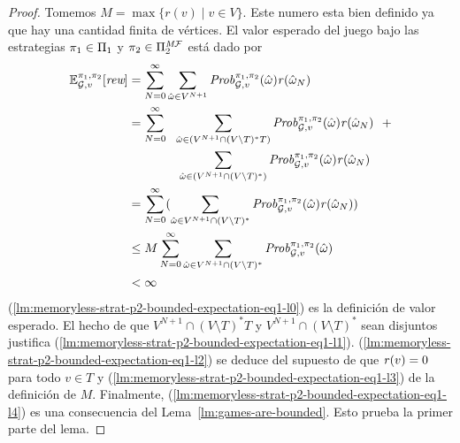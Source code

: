 \begin{proof}
  Tomemos $M = \max \{r(v) \mid v \in V\}$.  Este numero esta bien definido ya que
  hay una cantidad finita de vértices.
  El valor esperado del juego bajo las estrategias
  $\pi_{1} \in \Pi_{1}$ y $\pi_{2} \in \Pi^{\textit{M}\mathcal{F}}_{2}$
  está dado por
  \begin{align}	
    \label{lm:memoryless-strat-p2-bounded-expectation-eq1-l0}
    \mathbb{E}^{\pi_{1}, \pi_{2}}_{\mathcal{G},v}[\textit{rew}]
    & = \sum^{\infty}_{N=0} \sum_{\hat{\omega} \in V^{N+1}} \mathit{Prob}^{\pi_{1}, \pi_{2}}_{\mathcal{G},v}(\hat{\omega})\mathit{r}(\hat{\omega}_N) \\
    \label{lm:memoryless-strat-p2-bounded-expectation-eq1-l1}	
    & = \sum^{\infty}_{N=0} \ \ \sum_{\hat{\omega} \in (V^{N+1} \cap (V \setminus T)^*T)} \mathit{Prob}^{\pi_{1}, \pi_{2}}_{\mathcal{G},v}(\hat{\omega})  \mathit{r}(\hat{\omega}_N) \ \ + \notag\\
    &\hspace*{4em} \sum_{\hat{\omega} \in (V^{N+1} \cap (V \setminus T)^*)} \mathit{Prob}^{\pi_{1}, \pi_{2}}_{\mathcal{G},v}(\hat{\omega}) \mathit{r}(\hat{\omega}_N)   \\
    \label{lm:memoryless-strat-p2-bounded-expectation-eq1-l2}
    & =  \sum^{\infty}_{N=0}  (\sum_{\hat{\omega} \in V^{N+1} \cap (V \setminus T)^*} \mathit{Prob}^{\pi_{1}, \pi_{2}}_{\mathcal{G},v}(\hat{\omega}) \mathit{r}(\hat{\omega}_N) ) \\
    \label{lm:memoryless-strat-p2-bounded-expectation-eq1-l3}
    & \leq M \sum^{\infty}_{N=0}  \sum_{\hat{\omega} \in V^{N+1} \cap (V \setminus T)^*} \mathit{Prob}^{\pi_{1}, \pi_{2}}_{\mathcal{G},v}(\hat{\omega})  \\
    \label{lm:memoryless-strat-p2-bounded-expectation-eq1-l4}
    & < \infty 
  \end{align}
  (\ref{lm:memoryless-strat-p2-bounded-expectation-eq1-l0}) es la
  definición de valor esperado.
  El hecho de que $V^{N+1} \cap (V \setminus T)^*T$ y
  $V^{N+1} \cap (V \setminus T)^*$ sean disjuntos justifica
  (\ref{lm:memoryless-strat-p2-bounded-expectation-eq1-l1}).
  (\ref{lm:memoryless-strat-p2-bounded-expectation-eq1-l2}) se deduce
  del supuesto de que $\mathit{r}(v) = 0$ para todo $v \in T$ y
  (\ref{lm:memoryless-strat-p2-bounded-expectation-eq1-l3}) de la
  definición de $M$.
  Finalmente, (\ref{lm:memoryless-strat-p2-bounded-expectation-eq1-l4})
  es una consecuencia del Lema~\ref{lm:games-are-bounded}.
  Esto prueba la primer parte del lema.


\end{proof}
